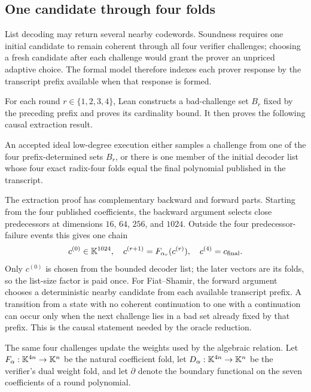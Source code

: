 \subsection{One candidate through four folds}

List decoding may return several nearby codewords.  Soundness requires one
initial candidate to remain coherent through all four verifier challenges;
choosing a fresh candidate after each challenge would grant the prover an
unpriced adaptive choice.  The formal model therefore indexes each prover
response by the transcript prefix available when that response is formed.

For each round \(r\in\{1,2,3,4\}\), Lean constructs a bad-challenge set
\(B_r\) fixed by the preceding prefix and proves its cardinality bound.  It
then proves the following causal extraction result.

\begin{theorem}
\label{thm:four-fold-extraction}
An accepted ideal low-degree execution either samples a challenge from one of
the four prefix-determined sets \(B_r\), or there is one member of the initial
decoder list whose four exact radix-four folds equal the final polynomial
published in the transcript.
\end{theorem}

The extraction proof has complementary backward and forward parts.  Starting
from the four published coefficients, the backward argument selects close
predecessors at dimensions \(16\), \(64\), \(256\), and \(1024\).  Outside
the four predecessor-failure events this gives one chain
\[
  c^{(0)}\in\mathbb{K}^{1024},\quad
  c^{(r+1)}=F_{\alpha_r}(c^{(r)}),\quad
  c^{(4)}=c_{\mathrm{final}}.
\]
Only \(c^{(0)}\) is chosen from the bounded decoder list; the later vectors
are its folds, so the list-size factor is paid once.  For Fiat--Shamir, the
forward argument chooses a deterministic nearby candidate from each available
transcript prefix.  A transition from a state with no coherent continuation
to one with a continuation can occur only when the next challenge lies in a
bad set already fixed by that prefix.  This is the causal statement needed by
the oracle reduction.

The same four challenges update the weights used by the algebraic relation.
Let \(F_\alpha:\mathbb{K}^{4n}\to\mathbb{K}^n\) be the natural coefficient fold, let
\(D_\alpha:\mathbb{K}^{4n}\to\mathbb{K}^n\) be the verifier's dual weight fold, and let
\(\partial\) denote the boundary functional on the seven coefficients of a
round polynomial.

